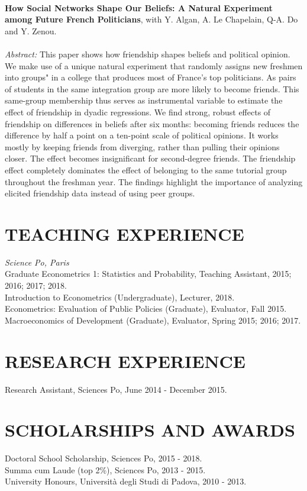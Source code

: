 \documentclass{res}
\begin{document}
\begin{resume}
\\
\textbf{How Social Networks Shape Our Beliefs: A Natural Experiment among Future French Politicians}, with Y. Algan, A. Le Chapelain, Q-A. Do and Y. Zenou. \\
\\
\textit{Abstract:} This paper shows how friendship shapes beliefs and political opinion. We make use of a unique natural experiment that randomly assigns new
freshmen into \integration groups" in a college that produces most of
France's top politicians. As pairs of students in the same integration
group are more likely to become friends. This same-group membership
thus serves as instrumental variable to estimate the effect of friendship
in dyadic regressions. We find strong, robust effects of friendship on
differences in beliefs after six months: becoming friends reduces the difference
by half a point on a ten-point scale of political opinions. It works
mostly by keeping friends from diverging, rather than pulling their opinions
closer. The effect becomes insignificant for second-degree friends.
The friendship effect completely dominates the effect of belonging to the
same tutorial group throughout the freshman year. The findings highlight
the importance of analyzing elicited friendship data instead of using
peer groups.
  
\section{\small TEACHING EXPERIENCE}
   \vspace{5pt}	
   \textit{Science Po, Paris} \\
   Graduate Econometrics 1: Statistics and Probability, Teaching Assistant, 2015; 2016; 2017; 2018. \\
   Introduction to Econometrics (Undergraduate), Lecturer, 2018. \\
   Econometrics: Evaluation of Public Policies (Graduate), Evaluator, Fall 2015. \\
   Macroeconomics of Development (Graduate), Evaluator, Spring 2015; 2016; 2017.

\section{\small RESEARCH EXPERIENCE}
   \vspace{5pt}
   Research Assistant, Sciences Po, June 2014 - December 2015.
    
\section{\small SCHOLARSHIPS AND AWARDS}
   \vspace{5pt}
Doctoral School Scholarship, Sciences Po, 2015 - 2018. \\
Summa cum Laude (top 2\%), Sciences Po, 2013 - 2015. \\
University Honours, Universit\`{a} degli Studi di Padova, 2010 - 2013.


\end{resume}
\end{document}
